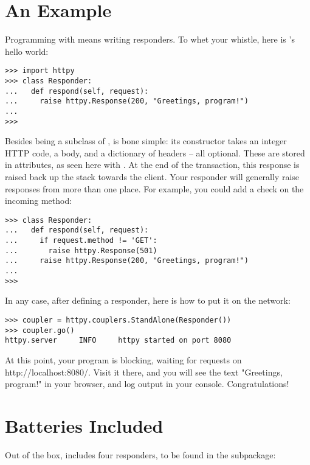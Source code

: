 \section{An Example}

Programming with  means writing responders. To whet your whistle,
here is 's hello world:

\begin{verbatim}
>>> import httpy
>>> class Responder:
...   def respond(self, request):
...     raise httpy.Response(200, "Greetings, program!")
...
>>>
\end{verbatim}

Besides being a subclass of ,  is
bone simple: its constructor takes an integer HTTP code, a body, and a
dictionary of headers -- all optional. These are stored in attributes, as seen
here with . At the end of the transaction, this response is raised
back up the stack towards the client. Your responder will generally raise
responses from more than one place. For example, you could add a check on the
incoming method:

\begin{verbatim}
>>> class Responder:
...   def respond(self, request):
...     if request.method != 'GET':
...       raise httpy.Response(501)
...     raise httpy.Response(200, "Greetings, program!")
...
>>>
\end{verbatim}

In any case, after defining a responder, here is how to put it on the network:

\begin{verbatim}
>>> coupler = httpy.couplers.StandAlone(Responder())
>>> coupler.go()
httpy.server     INFO     httpy started on port 8080
\end{verbatim}

At this point, your program is blocking, waiting for requests on
http://localhost:8080/. Visit it there, and you will see the text "Greetings,
program!" in your browser, and log output in your console. Congratulations!


\section{Batteries Included}

Out of the box,  includes four responders, to be found in the
 subpackage:

